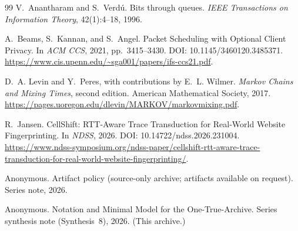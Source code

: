 \documentclass[11pt]{article}
\theoremstyle{definition}
\theoremstyle{remark}
\begin{document}
\begin{thebibliography}{99}
V.~Anantharam and S.~Verd\'u.
\newblock Bits through queues.
\newblock \emph{IEEE Transactions on Information Theory}, 42(1):4--18, 1996.

A.~Beams, S.~Kannan, and S.~Angel.
\newblock Packet Scheduling with Optional Client Privacy.
\newblock In \emph{ACM CCS}, 2021, pp.~3415--3430.
\newblock DOI: 10.1145/3460120.3485371.
\newblock \url{https://www.cis.upenn.edu/~sga001/papers/ifs-ccs21.pdf}.

D.~A. Levin and Y.~Peres, with contributions by E.~L. Wilmer.
\newblock \emph{Markov Chains and Mixing Times}, second edition.
\newblock American Mathematical Society, 2017.
\newblock \url{https://pages.uoregon.edu/dlevin/MARKOV/markovmixing.pdf}.

R.~Jansen.
\newblock CellShift: RTT-Aware Trace Transduction for Real-World Website Fingerprinting.
\newblock In \emph{NDSS}, 2026.
\newblock DOI: 10.14722/ndss.2026.231004.
\newblock \url{https://www.ndss-symposium.org/ndss-paper/cellshift-rtt-aware-trace-transduction-for-real-world-website-fingerprinting/}.


Anonymous.
\newblock Artifact policy (source-only archive; artifacts available on request).
\newblock Series note, 2026.


Anonymous.
\newblock Notation and Minimal Model for the One-True-Archive.
\newblock Series synthesis note (Synthesis~8), 2026. (This archive.)


\end{thebibliography}
\end{document}
